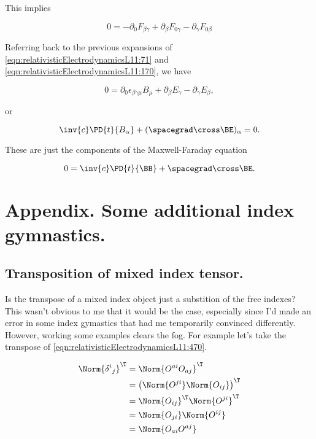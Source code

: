 This implies

\begin{equation}\label{eqn:relativisticElectrodynamicsL11:1320}
0 =
-\partial_0 F_{\beta \gamma}
+\partial_\beta F_{0 \gamma}
- \partial_\gamma F_{0 \beta}
\end{equation}

Referring back to the previous expansions of \ref{eqn:relativisticElectrodynamicsL11:71} and \ref{eqn:relativisticElectrodynamicsL11:170}, we have

\begin{equation}\label{eqn:relativisticElectrodynamicsL11:1340}
0 =
\partial_0 \epsilon_{\beta\gamma\mu} B_\mu
+\partial_\beta E_\gamma
- \partial_\gamma E_{\beta},
\end{equation}

or

\begin{equation}\label{eqn:relativisticElectrodynamicsL11:1360}
\inv{c} \PD{t}{B_\alpha} + (\spacegrad \cross \BE)_\alpha = 0.
\end{equation}

These are just the components of the Maxwell-Faraday equation

\begin{equation}\label{eqn:relativisticElectrodynamicsL11:930}
0 = \inv{c} \PD{t}{\BB} + \spacegrad \cross \BE.
\end{equation}

\section{Appendix. Some additional index gymnastics.}

\subsection{Transposition of mixed index tensor.}

Is the transpose of a mixed index object just a substition of the free indexes?  This wasn't obvious to me that it would be the case, especially since I'd made an error in some index gymastics that had me temporarily convinced differently.  However, working some examples clears the fog.  For example let's take the transpose of \ref{eqn:relativisticElectrodynamicsL11:470}.  

\begin{align*}
\Norm{ {\delta^i}_j }^\T 
&= 
\Norm{ O^{a i} O_{a j} }^\T \\
&= 
\left( \Norm{ O^{j i} } \Norm{ O_{i j} } \right)^\T \\
&=
\Norm{ O_{i j} }^\T
\Norm{ O^{j i} }^\T  \\
&=
\Norm{ O_{j i} }
\Norm{ O^{i j} } \\
&=
\Norm{ O_{a i} O^{a j} } \\
\end{align*}


